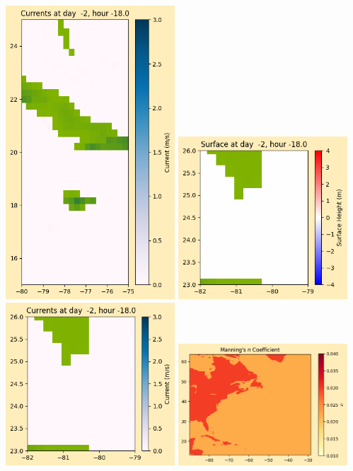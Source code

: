 \documentclass[11pt]{article}
\begin{document}
\includegraphics[width=0.475\textwidth]{frame0001fig1008.png}
\vskip 10pt 
\includegraphics[width=0.475\textwidth]{frame0001fig1009.png}
\includegraphics[width=0.475\textwidth]{frame0001fig1010.png}
\vskip 10pt 
\includegraphics[width=0.475\textwidth]{frame0001fig1011.png}
\end{document}
